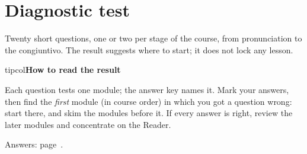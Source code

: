 \documentclass[11pt,a4paper,twoside,openright]{book}
\newcommand{\notelabel}[3]{{\sffamily\small\bfseries\color{#1}#2}\if\relax\detokenize{#3}\relax\else{\sffamily\small\bfseries\ ---\ #3}\fi\par\nopagebreak}
\begin{document}
\chapter{Diagnostic test}\label{diag}
Twenty short questions, one or two per stage of the course, from pronunciation to the congiuntivo. The result suggests where to start; it does not lock any lesson.\par
\begin{notebox}{tipcol}\notelabel{tipcol}{How to read the result}{}Each question tests one module; the answer key names it. Mark your answers, then find the \emph{first} module (in course order) in which you got a question wrong: start there, and skim the modules before it. If every answer is right, review the later modules and concentrate on the Reader.\end{notebox}
{\color{muted}\small Answers: page~\pageref{ans:diag}.}
\end{document}
